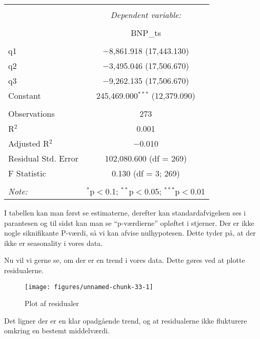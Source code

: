 \documentclass[
  10pt,
]{article}
\begin{document}
\begin{table}[!htbp] \centering 
  \caption{} 
  \label{} 
\begin{tabular}{@{\extracolsep{5pt}}lc} 
\\[-1.8ex]\hline 
\hline \\[-1.8ex] 
 & \multicolumn{1}{c}{\textit{Dependent variable:}} \\ 
\cline{2-2} 
\\[-1.8ex] & BNP\_ts \\ 
\hline \\[-1.8ex] 
 q1 & $-$8,861.918 (17,443.130) \\ 
  q2 & $-$3,495.046 (17,506.670) \\ 
  q3 & $-$9,262.135 (17,506.670) \\ 
  Constant & 245,469.000$^{***}$ (12,379.090) \\ 
 \hline \\[-1.8ex] 
Observations & 273 \\ 
R$^{2}$ & 0.001 \\ 
Adjusted R$^{2}$ & $-$0.010 \\ 
Residual Std. Error & 102,080.600 (df = 269) \\ 
F Statistic & 0.130 (df = 3; 269) \\ 
\hline 
\hline \\[-1.8ex] 
\textit{Note:}  & \multicolumn{1}{r}{$^{*}$p$<$0.1; $^{**}$p$<$0.05; $^{***}$p$<$0.01} \\ 
\end{tabular} 
\end{table}

I tabellen kan man først se estimaterne, derefter kan standardafvigelsen
ses i parantesen og til sidst kan man se ``p-værdierne'' opløftet i
stjerner. Der er ikke nogle siknifikante P-værdi, så vi kan afvise
nulhypotesen. Dette tyder på, at der ikke er seasonality i vores data.

Nu vil vi gerne se, om der er en trend i vores data. Dette gøres ved at
plotte residualerne.

\begin{figure}[H]

{\centering \texttt{[image: figures/unnamed-chunk-33-1]} 

}

\caption{\label{fig:bnpbreak}Plot af residualer}\label{fig:unnamed-chunk-33}
\end{figure}

Det ligner der er en klar opadgående trend, og at residualerne ikke
flukturere omkring en bestemt middelværdi.
\end{document}
